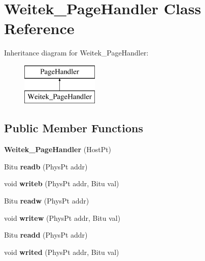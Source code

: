 \hypertarget{classWeitek__PageHandler}{\section{Weitek\-\_\-\-Page\-Handler Class Reference}
\label{classWeitek__PageHandler}
}
Inheritance diagram for Weitek\-\_\-\-Page\-Handler\-:\begin{figure}[H]
\begin{center}
\leavevmode
\includegraphics[height=2.000000cm]{classWeitek__PageHandler}
\end{center}
\end{figure}
\subsection*{Public Member Functions}
\begin{DoxyCompactItemize}
\item 
\hypertarget{classWeitek__PageHandler_a6f9d1ac5f330e31e71912b235a62ae4d}{{\bfseries Weitek\-\_\-\-Page\-Handler} (Host\-Pt)}\label{classWeitek__PageHandler_a6f9d1ac5f330e31e71912b235a62ae4d}

\item 
\hypertarget{classWeitek__PageHandler_a00d66577dacd125785e9357a214fbb5d}{Bitu {\bfseries readb} (Phys\-Pt addr)}\label{classWeitek__PageHandler_a00d66577dacd125785e9357a214fbb5d}

\item 
\hypertarget{classWeitek__PageHandler_a563b1807cab521e05bbb54f0cf700eb3}{void {\bfseries writeb} (Phys\-Pt addr, Bitu val)}\label{classWeitek__PageHandler_a563b1807cab521e05bbb54f0cf700eb3}

\item 
\hypertarget{classWeitek__PageHandler_a34e58ee02c7beeac4605e6d7002255a9}{Bitu {\bfseries readw} (Phys\-Pt addr)}\label{classWeitek__PageHandler_a34e58ee02c7beeac4605e6d7002255a9}

\item 
\hypertarget{classWeitek__PageHandler_a9bb3c410818ba66813c8247fea603ed3}{void {\bfseries writew} (Phys\-Pt addr, Bitu val)}\label{classWeitek__PageHandler_a9bb3c410818ba66813c8247fea603ed3}

\item 
\hypertarget{classWeitek__PageHandler_a530fad048336c11be9ef296b357bd31a}{Bitu {\bfseries readd} (Phys\-Pt addr)}\label{classWeitek__PageHandler_a530fad048336c11be9ef296b357bd31a}

\item 
\hypertarget{classWeitek__PageHandler_a3a3377a7fe0b24712d716eddc5d31260}{void {\bfseries writed} (Phys\-Pt addr, Bitu val)}\label{classWeitek__PageHandler_a3a3377a7fe0b24712d716eddc5d31260}

\end{DoxyCompactItemize}


